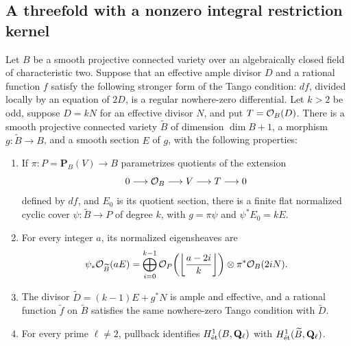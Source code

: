 \subsection{A threefold with a nonzero integral restriction kernel}

\begin{lemma}
\label{lem:OC-positive-Tango-iteration}
Let $B$ be a smooth projective connected variety over an algebraically closed field of characteristic two.  Suppose that an effective ample divisor $D$ and a rational function $f$ satisfy the following stronger form of the Tango condition: $df$, divided locally by an equation of $2D$, is a regular nowhere-zero differential.  Let $k>2$ be odd, suppose $D=kN$ for an effective divisor $N$, and put $T=\OO_B(D)$.
There is a smooth projective connected variety $\widetilde B$ of dimension $\dim B+1$, a morphism $g:\widetilde B\to B$, and a smooth section $E$ of $g$, with the following properties:
\begin{enumerate}
\item If $\pi:P=\mathbf P_B(V)\to B$ parametrizes quotients of the extension
\[
 0\longrightarrow\OO_B\longrightarrow V\longrightarrow T\longrightarrow0
\]
defined by $df$, and $E_0$ is its quotient section, there is a finite flat normalized cyclic cover $\psi:\widetilde B\to P$ of degree $k$, with $g=\pi\psi$ and $\psi^*E_0=kE$.
\item For every integer $a$, its normalized eigensheaves are
\begin{equation}\label{eq:OC-iteration-eigensheaves}
 \psi_*\OO_{\widetilde B}(aE)
 =\bigoplus_{i=0}^{k-1}
   \OO_P\!\left(\left\lfloor\frac{a-2i}{k}\right\rfloor\right)
                       \otimes\pi^*\OO_B(2iN).
\end{equation}
\item The divisor $\widetilde D=(k-1)E+g^*N$ is ample and effective, and a rational function $\widetilde f$ on $\widetilde B$ satisfies the same nowhere-zero Tango condition with $\widetilde D$.
\item For every prime $\ell\ne2$, pullback identifies
$H^1_{\et}(B,\mathbf Q_\ell)$ with $H^1_{\et}(\widetilde B,\mathbf Q_\ell)$.
\end{enumerate}
\end{lemma}
